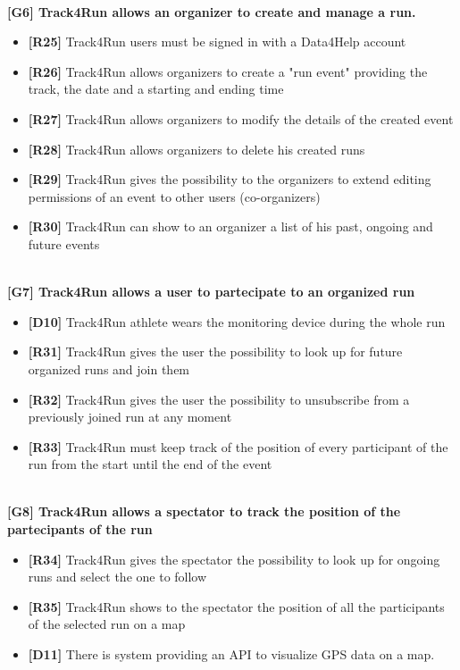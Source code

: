 \\
\textbf{[G6] Track4Run allows an organizer to create and manage a run.}
\begin{itemize}
	\item \textbf{[R25]} Track4Run users must be signed in with a Data4Help account
	\item \textbf{[R26]} Track4Run allows organizers to create a "run event" providing the track, the date and a starting and ending time
	\item \textbf{[R27]}  Track4Run allows organizers to modify the details of the created event
	\item \textbf{[R28]} Track4Run allows organizers to delete his created runs
	\item \textbf{[R29]} Track4Run gives the possibility to the organizers to extend editing permissions of an event to other users (co-organizers) 
	\item \textbf{[R30]} Track4Run can show to an organizer a list of his past, ongoing and future events
\end{itemize}
\\
\textbf{[G7] Track4Run allows a user to partecipate to an organized run}
\begin{itemize}
	\item \textbf{[D10]} Track4Run athlete wears the monitoring device during the whole run
	\item \textbf{[R31]} Track4Run gives the user the possibility to look up for future organized runs and join them
	\item \textbf{[R32]} Track4Run gives the user the possibility to unsubscribe from a previously joined run at any moment
	\item \textbf{[R33]} Track4Run must keep track of the position of every participant of the run from the start until the end of the event
\end{itemize}
\\
\textbf{[G8] Track4Run allows a spectator to track the position of the partecipants of the run}
\begin{itemize}
	\item \textbf{[R34]} Track4Run gives the spectator the possibility to look up for ongoing runs and select the one to follow
	\item \textbf{[R35]} Track4Run shows to the spectator the position of all the participants of the selected run on a map
	\item \textbf{[D11]} There is system providing an API to visualize GPS data on a map.
\end{itemize}
 
